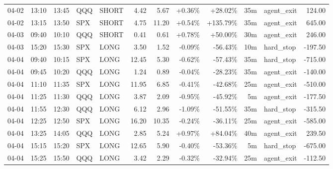 \documentclass[11pt,a4paper,twoside]{article}
\begin{document}
\begin{center}
\begin{longtable}{>{\color{txtmain}}l l l l l r r r r r >{\color{txtmain}}l r}
04-02 & 13:10 & 13:45 & QQQ & SHORT & 4.42 & 5.67 & \textcolor{wingreen}{+0.36\%} & \textcolor{wingreen}{+28.02\%} & 35m & agent\_exit & \textcolor{wingreen}{124.00} \\
04-02 & 13:15 & 13:50 & SPX & SHORT & 4.75 & 11.20 & \textcolor{wingreen}{+0.54\%} & \textcolor{wingreen}{+135.79\%} & 35m & agent\_exit & \textcolor{wingreen}{645.00} \\
04-03 & 09:40 & 10:10 & QQQ & SHORT & 0.41 & 0.61 & \textcolor{wingreen}{+0.78\%} & \textcolor{wingreen}{+50.00\%} & 30m & agent\_exit & \textcolor{wingreen}{246.00} \\
04-03 & 15:20 & 15:30 & SPX & LONG & 3.50 & 1.52 & \textcolor{lossred}{-0.09\%} & \textcolor{lossred}{-56.43\%} & 10m & hard\_stop & \textcolor{lossred}{-197.50} \\
04-04 & 09:40 & 10:15 & SPX & LONG & 12.45 & 5.30 & \textcolor{lossred}{-0.62\%} & \textcolor{lossred}{-57.43\%} & 35m & hard\_stop & \textcolor{lossred}{-715.00} \\
04-04 & 09:45 & 10:20 & QQQ & LONG & 1.24 & 0.89 & \textcolor{lossred}{-0.04\%} & \textcolor{lossred}{-28.23\%} & 35m & agent\_exit & \textcolor{lossred}{-140.00} \\
04-04 & 11:10 & 11:35 & SPX & LONG & 11.95 & 6.85 & \textcolor{lossred}{-0.41\%} & \textcolor{lossred}{-42.68\%} & 25m & agent\_exit & \textcolor{lossred}{-510.00} \\
04-04 & 11:25 & 11:30 & QQQ & LONG & 3.87 & 2.09 & \textcolor{lossred}{-0.95\%} & \textcolor{lossred}{-45.92\%} & 5m & agent\_exit & \textcolor{lossred}{-177.50} \\
04-04 & 11:55 & 12:30 & QQQ & LONG & 6.12 & 2.96 & \textcolor{lossred}{-1.09\%} & \textcolor{lossred}{-51.55\%} & 35m & hard\_stop & \textcolor{lossred}{-315.50} \\
04-04 & 12:25 & 12:50 & SPX & LONG & 16.20 & 10.35 & \textcolor{lossred}{-0.24\%} & \textcolor{lossred}{-36.11\%} & 25m & agent\_exit & \textcolor{lossred}{-585.00} \\
04-04 & 13:25 & 14:05 & QQQ & LONG & 2.85 & 5.24 & \textcolor{wingreen}{+0.97\%} & \textcolor{wingreen}{+84.04\%} & 40m & agent\_exit & \textcolor{wingreen}{239.50} \\
04-04 & 15:15 & 15:20 & SPX & LONG & 12.65 & 5.90 & \textcolor{lossred}{-0.40\%} & \textcolor{lossred}{-53.36\%} & 5m & hard\_stop & \textcolor{lossred}{-675.00} \\
04-04 & 15:25 & 15:50 & QQQ & LONG & 3.42 & 2.29 & \textcolor{lossred}{-0.32\%} & \textcolor{lossred}{-32.94\%} & 25m & agent\_exit & \textcolor{lossred}{-112.50} \\

\end{longtable}
\end{center}
\end{document}
